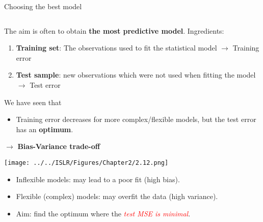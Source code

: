 \documentclass[ignorenonframetext,]{beamer}
\providecommand{\tightlist}{%
  \setlength{\itemsep}{0pt}\setlength{\parskip}{0pt}}
\begin{document}
\begin{frame}

\begin{block}{Choosing the best model}

\(~\)

The aim is often to obtain \textbf{the most predictive model}.
Ingredients:

\vspace{2mm}

\begin{enumerate}
\tightlist
\item
  \textbf{Training set}: The observations used to fit the statistical
  model \(\rightarrow\) Training error
\end{enumerate}

\vspace{2mm}

\begin{enumerate}
\setcounter{enumi}{1}
\tightlist
\item
  \textbf{Test sample}: new observations which were not used when
  fitting the model \(\rightarrow\) Test error
\end{enumerate}

\vspace{4mm}

We have seen that

\vspace{4mm}

\begin{itemize}
\tightlist
\item
  Training error decreases for more complex/flexible models, but the
  test error has an \textbf{optimum}.
\end{itemize}

\centering

\(\rightarrow\) \textbf{Bias-Variance trade-off}

\end{block}

\end{frame}

\begin{frame}

\texttt{[image: ../../ISLR/Figures/Chapter2/2.12.png]}

\begin{itemize}
\tightlist
\item
  Inflexible models: may lead to a poor fit (high bias).
\item
  Flexible (complex) models: may overfit the data (high variance).
\item
  Aim: find the optimum where the
  \emph{\textcolor{red}{test MSE is minimal}}.
\end{itemize}

\end{frame}
\end{document}
